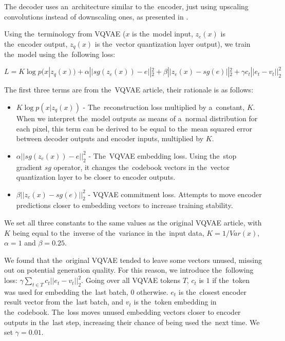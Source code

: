 The decoder uses an~architecture similar to the~encoder, just using upscaling convolutions instead of downscaling ones, as presented in .



Using the~terminology from VQVAE ($x$ is the~model input, $z_e(x)$ is the~encoder output, $z_q(x)$ is the~vector quantization layer output), we train the~model using the~following loss:

$$L = K\log p(x|z_q(x)) + \alpha ||sg(z_e(x)) - e||_2^2 + \beta ||z_e(x) - sg(e)||_2^2 + \gamma c_t ||e_t - v_t||_2^2$$

The first three terms are from the~VQVAE article, their rationale is as follows:

\begin{itemize}
\item $K\log p(x|z_q(x))$ - The~reconstruction loss multiplied by a~constant, $K$. When we interpret the~model outputs as means of a~normal distribution for each pixel, this term can be derived to be equal to the~mean squared error between decoder outputs and encoder inputs, multiplied by $K$.
\item $\alpha ||sg(z_e(x)) - e||_2^2$ - The~VQVAE embedding loss. Using the~stop gradient $sg$ operator, it changes the~codebook vectors in the~vector quantization layer to be closer to encoder outputs.
\item $\beta ||z_e(x) - sg(e)||_2^2$ - VQVAE commitment loss. Attempts to move encoder predictions closer to embedding vectors to increase training stability.
\end{itemize}

We set all three constants to the same values as the original VQVAE article, with $K$ being equal to the~inverse of the~variance in the~input data, $K=1/Var(x)$, $\alpha=1$ and $\beta=0.25$.

We found that the~original VQVAE tended to leave some vectors unused, missing out on potential generation quality. For this reason, we introduce the~following loss: $\gamma \sum_{t \in T} c_t ||e_t - v_t||_2^2$. Going over all VQVAE tokens $T$, $c_t$ is $1$ if the~token was used for embedding the~last batch, $0$ otherwise. $e_t$ is the~closest encoder result vector from the~last batch, and $v_t$ is the~token embedding in the~codebook. The~loss moves unused embedding vectors closer to encoder outputs in the~last step, increasing their chance of being used the~next time. We set $\gamma=0.01$.

